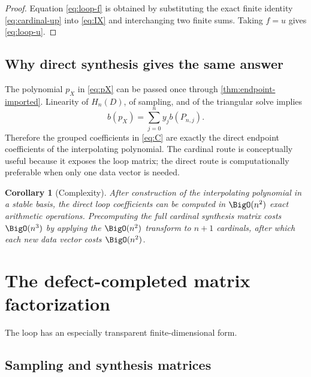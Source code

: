 \documentclass[11pt,oneside]{article}
\newtheorem{corollary}[theorem]{Corollary}
\theoremstyle{definition}
\theoremstyle{remark}
\newcommand{\1}{\mathbf{1}}
\begin{document}
\begin{proof}
Equation \eqref{eq:loop-f} is obtained by substituting the exact finite
identity \eqref{eq:cardinal-up} into \eqref{eq:IX} and interchanging two
finite sums.  Taking $f=u$ gives \eqref{eq:loop-u}.
\end{proof}

\subsection{Why direct synthesis gives the same answer}

The polynomial $p_X$ in \eqref{eq:pX} can be passed once through
\cref{thm:endpoint-imported}.  Linearity of $H_n(D)$, of sampling, and of the
triangular solve implies
\begin{equation}
 b(p_X)=\sum_{j=0}^ny_jb(P_{n,j}).
 \label{eq:direct-equals-grouped}
\end{equation}
Therefore the grouped coefficients in \eqref{eq:C} are exactly the direct
endpoint coefficients of the interpolating polynomial.  The cardinal route
is conceptually useful because it exposes the loop matrix; the direct route
is computationally preferable when only one data vector is needed.

\begin{corollary}[Complexity]
After construction of the interpolating polynomial in a stable basis, the
direct loop coefficients can be computed in $\BigO(n^2)$ exact arithmetic
operations.  Precomputing the full cardinal synthesis matrix costs
$\BigO(n^3)$ by applying the $\BigO(n^2)$ transform to $n+1$ cardinals, after
which each new data vector costs $\BigO(n^2)$.
\end{corollary}

\section{The defect-completed matrix factorization}
\label{sec:defect-matrix}

The loop has an especially transparent finite-dimensional form.

\subsection{Sampling and synthesis matrices}
\end{document}
